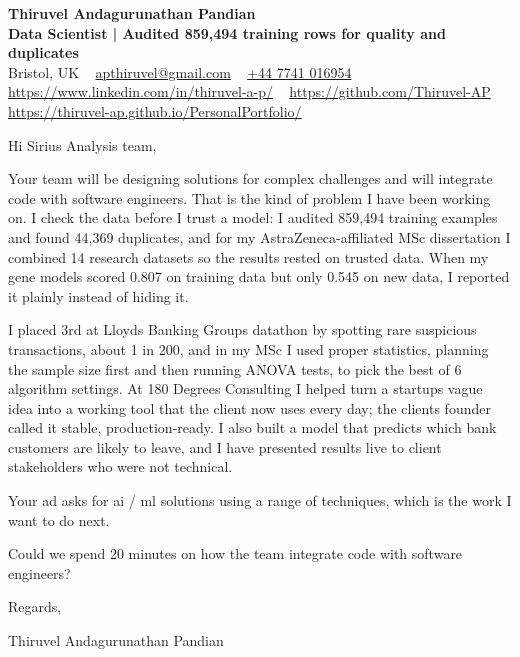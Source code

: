 \documentclass[11pt,a4paper]{article}
\newcommand{\num}[1]{\textbf{#1}}   %
\begin{document}
\raggedright
\pagestyle{empty}

\begin{center}
    {\LARGE \color{linkblue} \textbf{Thiruvel Andagurunathan Pandian}}\\[0.2cm]
    {\color{headernavy}\small\textbf{Data Scientist | Audited \num{859,494} training rows for quality and duplicates}}\\[0.2cm]
    {\small Bristol, UK\nobreak\ \,\textbar\, \href{mailto:apthiruvel@gmail.com}{apthiruvel@gmail.com}\nobreak\ \,\textbar\, \href{tel:+447741016954}{+44 7741 016954}\nobreak\ \,\textbar\, \href{https://www.linkedin.com/in/thiruvel-a-p/}{https://www.linkedin.com/in/thiruvel-a-p/}\nobreak\ \,\textbar\, \href{https://github.com/Thiruvel-AP}{https://github.com/Thiruvel-AP}\nobreak\ \,\textbar\, \href{https://thiruvel-ap.github.io/PersonalPortfolio/}{https://thiruvel-ap.github.io/PersonalPortfolio/}}

\end{center}

\vspace{0.4cm}

\noindent
Hi Sirius Analysis team,

Your team will be designing solutions for complex challenges and will integrate code with software engineers. That is the kind of problem I have been working on. I check the data before I trust a model: I audited 859,494 training examples and found 44,369 duplicates, and for my AstraZeneca-affiliated MSc dissertation I combined 14 research datasets so the results rested on trusted data. When my gene models scored 0.807 on training data but only 0.545 on new data, I reported it plainly instead of hiding it.

I placed 3rd at Lloyd\textquotesingle{}s Banking Group\textquotesingle{}s datathon by spotting rare suspicious transactions, about 1 in 200, and in my MSc I used proper statistics, planning the sample size first and then running ANOVA tests, to pick the best of 6 algorithm settings. At 180 Degrees Consulting I helped turn a startup\textquotesingle{}s vague idea into a working tool that the client now uses every day; the client\textquotesingle{}s founder called it \textquotedbl{}stable, production-ready\textquotedbl{}. I also built a model that predicts which bank customers are likely to leave, and I have presented results live to client stakeholders who were not technical.

Your ad asks for ai / ml solutions using a range of techniques, which is the work I want to do next.

Could we spend 20 minutes on how the team integrate code with software engineers?

\vspace{0.5cm}

Regards,

Thiruvel Andagurunathan Pandian
\end{document}
